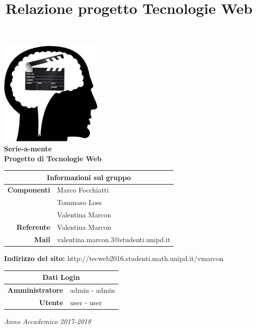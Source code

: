 \documentclass{tecweb}
\title{Relazione progetto Tecnologie Web}
\begin{document}
	\begin{titlepage}
		\begin{center}
			\includegraphics[width=5cm]{Logo2}
			\vspace{0.5cm}	\\
			\Huge \textbf{Serie-a-mente}
			\vspace{0.5cm}\\
			\normalsize \textbf{Progetto di Tecnologie Web}
			\vspace{0.7cm}	\\
			\renewcommand\arraystretch{1.3}	
			\begin{tabularx}{11cm}{r|X}
				\multicolumn{2}{c}{\textbf{Informazioni sul gruppo}}\\ 
				\hline
				\textbf{Componenti} & Marco Focchiatti \\ & Tommaso Loss \\ & Valentina Marcon \\  
				\textbf{Referente} & Valentina Marcon \\ 
				\textbf{Mail} & valentina.marcon.3@studenti.unipd.it \\
			\end{tabularx}
			\vspace{0.7cm}
			\textbf{Indirizzo del sito:} http://tecweb2016.studenti.math.unipd.it/vmarcon
			\vspace{0.7cm}	\\
			\begin{tabularx}{11cm}{r|X}
				\multicolumn{2}{c}{\textbf{Dati Login}}\\ 
				\hline
				\textbf{Amministratore} & admin - admin \\
				\textbf{Utente} & user - user
			\end{tabularx}
		\vspace{2cm}
		\textit{Anno Accademico 2017-2018}
			
		\end{center}
	\end{titlepage}
	\tableofcontents
	\newpage
\end{document}
